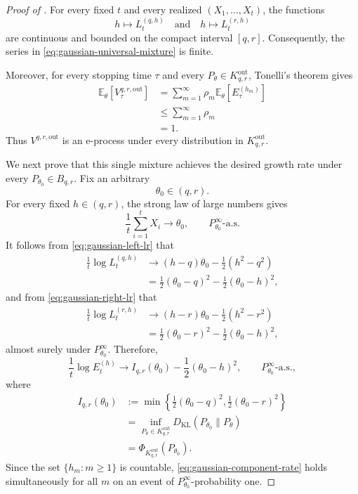 \documentclass[12pt]{article}
\theoremstyle{spaced}
\theoremstyle{remark}
\begin{document}
\begin{proof}[Proof of ]
For every fixed $t$ and every realized
$(X_1,\ldots,X_t)$, the functions
\[
    h\longmapsto L_t^{(q,h)}
    \quad\text{and}\quad
    h\longmapsto L_t^{(r,h)}
\]
are continuous and bounded on the compact interval $[q,r]$.
Consequently, the series in
\eqref{eq:gaussian-universal-mixture} is finite.

Moreover, for every stopping time $\tau$ and every
$P_\theta\in K_{q,r}^{\mathrm{out}}$, Tonelli's theorem gives
\begin{align*}
    \mathbb E_\theta
    \left[
        V_\tau^{q,r,\mathrm{out}}
    \right]
    &=
    \sum_{m=1}^\infty
    \rho_m
    \mathbb E_\theta
    \left[
        E_\tau^{(h_m)}
    \right]\\
    &\le
    \sum_{m=1}^\infty\rho_m\\
    &=1.
\end{align*}
Thus $V^{q,r,\mathrm{out}}$ is an e-process under every
distribution in $K_{q,r}^{\mathrm{out}}$.

We next prove that this single mixture achieves the desired
growth rate under every $P_{\theta_0}\in B_{q,r}$. Fix an
arbitrary
\[
    \theta_0\in(q,r).
\]
For every fixed $h\in(q,r)$, the strong law of large numbers
gives
\[
    \frac1t\sum_{i=1}^tX_i
    \longrightarrow
    \theta_0,
    \qquad
    P_{\theta_0}^\infty\text{-a.s.}
\]
It follows from \eqref{eq:gaussian-left-lr} that
\begin{align*}
    \frac1t\log L_t^{(q,h)}
    &\longrightarrow
    (h-q)\theta_0-\frac12(h^2-q^2)\\
    &=
    \frac12(\theta_0-q)^2
    -
    \frac12(\theta_0-h)^2,
\end{align*}
and from \eqref{eq:gaussian-right-lr} that
\begin{align*}
    \frac1t\log L_t^{(r,h)}
    &\longrightarrow
    (h-r)\theta_0-\frac12(h^2-r^2)\\
    &=
    \frac12(\theta_0-r)^2
    -
    \frac12(\theta_0-h)^2,
\end{align*}
almost surely under $P_{\theta_0}^\infty$. Therefore,
\begin{equation}
\label{eq:gaussian-component-rate}
    \frac1t\log E_t^{(h)}
    \longrightarrow
    I_{q,r}(\theta_0)
    -
    \frac12(\theta_0-h)^2,
    \qquad
    P_{\theta_0}^\infty\text{-a.s.},
\end{equation}
where
\begin{align}
    I_{q,r}(\theta_0)
    &:=
    \min\left\{
        \frac12(\theta_0-q)^2,
        \frac12(\theta_0-r)^2
    \right\}
    \nonumber\\
    &=
    \inf_{P_\theta\in K_{q,r}^{\mathrm{out}}}
    D_{\mathrm{KL}}(P_{\theta_0}\|P_\theta)
    \nonumber\\
    &=
    \Phi_{K_{q,r}^{\mathrm{out}}}(P_{\theta_0}).
    \label{eq:gaussian-exterior-kl}
\end{align}
Since the set $\{h_m:m\ge1\}$ is countable,
\eqref{eq:gaussian-component-rate} holds simultaneously for all
$m$ on an event of $P_{\theta_0}^\infty$-probability one.


\end{proof}
\end{document}

